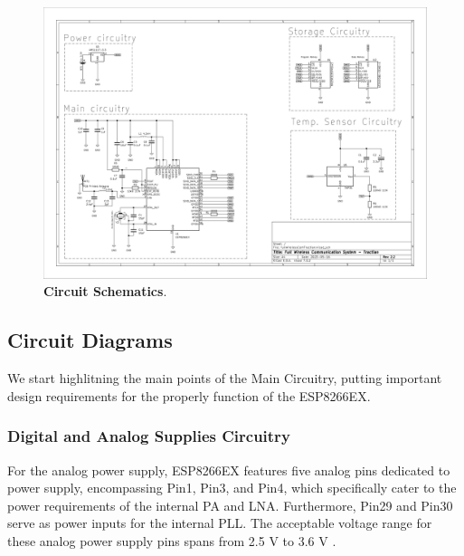 \begin{landscape}

\begin{figure}[H]
    \centering
    \includegraphics[scale = 0.775]{imagens/schematics-1.png}
    \caption{\textbf{Circuit Schematics}.}
    \label{02fig:schematics-1}
\end{figure}



\end{landscape}


\subsection{Circuit Diagrams}\label{02Sub:CircuitDiagrams}

We start highlitning the main points of the Main Circuitry, putting important
design requirements for the properly function of the ESP8266EX.

\subsubsection{Digital and Analog Supplies Circuitry}\label{02SubSub:DigitalAndAnalogSuppliesCircuitry}

For the analog power supply, ESP8266EX features five analog pins dedicated to power supply, encompassing Pin1, Pin3, and Pin4, 
which specifically cater to the power requirements of the internal PA and LNA. Furthermore, Pin29 and Pin30 serve as power inputs for the internal PLL. 
The acceptable voltage range for these analog power supply pins spans from 2.5 V to 3.6 V \cite{ESP8266HGL}.  \\ 

